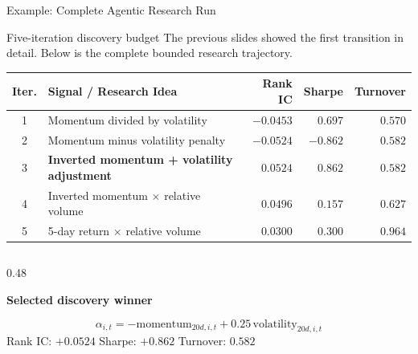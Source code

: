 \documentclass[10pt,aspectratio=169]{beamer}
\begin{document}
\begin{frame}{Example: Complete Agentic Research Run}

\scriptsize

\begin{block}{Five-iteration discovery budget}
The previous slides showed the first transition in detail.
Below is the complete bounded research trajectory.
\end{block}

\vspace{0.10cm}

\centering

\begin{tabular}{c p{4.1cm} r r r}
\toprule
\textbf{Iter.} &
\textbf{Signal / Research Idea} &
\textbf{Rank IC} &
\textbf{Sharpe} &
\textbf{Turnover} \\
\midrule

1 &
Momentum divided by volatility &
$-0.0453$ &
$0.697$ &
$0.570$ \\

2 &
Momentum minus volatility penalty &
$-0.0524$ &
$-0.862$ &
$0.582$ \\

3 &
\textbf{Inverted momentum + volatility adjustment} &
$\mathbf{0.0524}$ &
$\mathbf{0.862}$ &
$0.582$ \\

4 &
Inverted momentum $\times$ relative volume &
$0.0496$ &
$0.157$ &
$0.627$ \\

5 &
5-day return $\times$ relative volume &
$0.0300$ &
$0.300$ &
$0.964$ \\

\bottomrule
\end{tabular}

\vspace{0.22cm}

\begin{columns}[T,onlytextwidth]

\begin{column}{0.48\textwidth}

\textbf{Selected discovery winner}

\[\alpha_{i,t}=-\text{momentum}_{20d,i,t}+0.25\,\text{volatility}_{20d,i,t}\]
\centering
Rank IC: \textbf{$+0.0524$}
Sharpe: \textbf{$+0.862$}
Turnover: $0.582$


\end{column}
\end{columns}
\end{frame}
\end{document}
